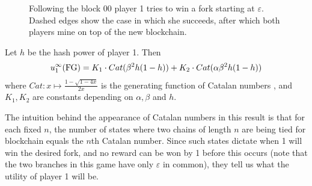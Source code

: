 \begin{figure}
\begin{center}
\end{center}
\caption{Following the block 00 player 1 tries to win a fork starting at $\varepsilon$. Dashed edges show the case in which she succeeds, after which both players mine on top of the new blockchain.}
\label{fig-fork_genesis}
\end{figure}

\begin{myprop}
	\label{prop:utility_gen_fork}
Let $h$ be the hash power of player 1. Then
	\begin{eqnarray*}
		u_1^\infty(\text{\rm FG}) =K_1\cdot Cat(\beta^2h(1-h))+K_2\cdot Cat(\alpha\beta^2h(1-h))
	\end{eqnarray*}
where $Cat:x\mapsto \frac{1-\sqrt{1-4x}}{2x}$ is the generating function of Catalan numbers \cite{ADD_CITATION}, and $K_1,K_2$ are constants depending on $\alpha,\beta$ and $h$.
\end{myprop}

The intuition behind the appearance of Catalan numbers in this result is that for each fixed $n$, the number of states where two chains of length $n$ are being tied for blockchain equals the $n$th Catalan number. Since such states dictate when 1 will win the desired fork, and no reward can be won by 1 before this occurs (note that the two branches in this game have only $\varepsilon$ in common), they tell us what the utility of player 1 will be.

